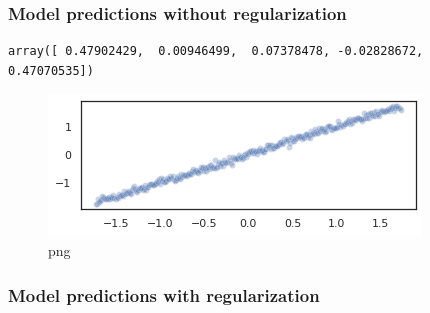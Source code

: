 \hypertarget{model-predictions-without-regularization}{%
\subsubsection{\texorpdfstring{Model predictions \textbf{without}
regularization}{Model predictions without regularization}}\label{model-predictions-without-regularization}}

\begin{Shaded}
\begin{Highlighting}[]
\OperatorTok{=}\OperatorTok{=}\NormalTok{)}
\OperatorTok{=}\OperatorTok{=}
\OperatorTok{=}
\OperatorTok{=}\OperatorTok{=}\OperatorTok{=}\NormalTok{)}
\end{Highlighting}
\end{Shaded}

\begin{verbatim}
array([ 0.47902429,  0.00946499,  0.07378478, -0.02828672,  0.47070535])
\end{verbatim}

\begin{figure}
\centering
\includegraphics{normality_and_linearity_violation_files/normality_and_linearity_violation_5_1.png}
\caption{png}
\end{figure}

\hypertarget{model-predictions-with-regularization}{%
\subsubsection{\texorpdfstring{Model predictions \textbf{with}
regularization}{Model predictions with regularization}}\label{model-predictions-with-regularization}}

\begin{Shaded}
\begin{Highlighting}[]
\OperatorTok{=}\OperatorTok{=}\NormalTok{)}
\OperatorTok{=}\OperatorTok{=}
\OperatorTok{=}
\OperatorTok{=}\OperatorTok{=}\OperatorTok{=}\NormalTok{)}
\end{Highlighting}
\end{Shaded}

